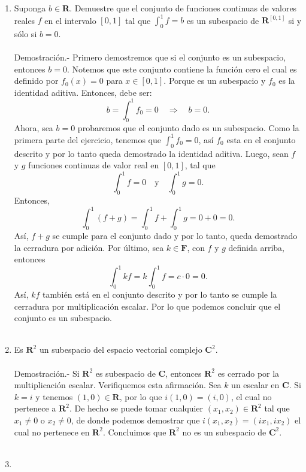 \begin{enumerate}[\bfseries 1.]
    \item Suponga $b\in \textbf{R}$. Demuestre que el conjunto de funciones continuas de valores reales $f$ en el intervalo $[0,1]$ tal que $\int_0^1 f = b$ es un subespacio de $\textbf{R}^{[0,1]}$ si y sólo si $b=0$.\\\\
	Demostración.-\; Primero demostremos que si el conjunto es un subespacio, entonces $b=0$. Notemos que este conjunto contiene la función cero el cual es definido por $f_0(x)=0$ para $x\in[0,1]$. Porque es un subespacio y $f_0$ es la identidad aditiva. Entonces, debe ser:
	$$b=\int_0^1 f_0=0\quad \Rightarrow \quad b=0.$$
	Ahora, sea $b=0$ probaremos que el conjunto dado es un subespacio. Como la primera parte del ejercicio, tenemos que $\int_0^1 f_0=0$, así $f_0$ esta en el conjunto descrito y por lo tanto queda demostrado la identidad aditiva. Luego, sean $f$ y $g$ funciones continuas de valor real en $[0,1]$, tal que 
	$$\int_0^1 f=0\quad \mbox{y}\quad \int_0^1 g = 0.$$
	Entonces,
	$$\int_0^1 (f+g)=\int_0^1 f + \int_0^1 g = 0+0=0.$$
	Así, $f+g$ se cumple para el conjunto dado y por lo tanto, queda demostrado la cerradura por adición. Por último, sea $k\in \textbf{F}$, con $f$ y $g$ definida arriba, entonces
	$$\int_0^1 kf = k\int_0^1 f = c\cdot 0 = 0.$$
	Así, $kf$ también está en el conjunto descrito y por lo tanto se cumple la cerradura por multiplicación escalar. Por lo que podemos concluir que el conjunto es un subespacio.\\\\

    \item Es $\textbf{R}^2$ un subespacio del espacio vectorial complejo $\textbf{C}^2$.\\\\
	Demostración.-\; Si $\textbf{R}^2$ es subespacio de $\textbf{C}$, entonces $\textbf{R}^2$ es cerrado por la multiplicación escalar. Verifiquemos esta afirmación. Sea $k$ un escalar en $\textbf{C}$. Si $k=i$ y tenemos $(1,0)\in \textbf{R}$, por lo que $i(1,0)=(i,0)$, el cual no pertenece a $\textbf{R}^2.$ De hecho se puede tomar cualquier $(x_1,x_2)\in \textbf{R}^2$ tal que $x_1\neq 0$ o $x_2\neq 0$, de donde podemos demostrar que $i(x_1,x_2)=(ix_1,ix_2)$ el cual no pertenece en $\textbf{R}^2$. Concluimos que $\textbf{R}^2$ no es un subespacio de $\textbf{C}^2.$\\\\

    \item 
	\begin{enumerate}[(a)]


\end{enumerate}
\end{enumerate}
